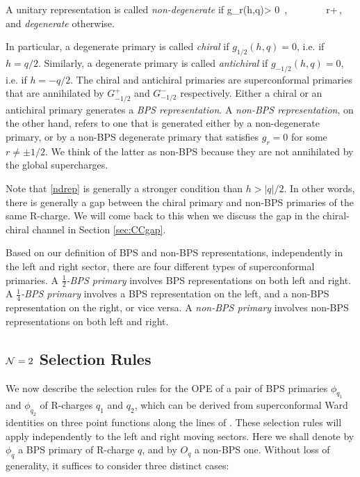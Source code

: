 \documentclass[12pt]{article}
\begin{document}
 
A unitary representation is called  \textit{non-degenerate} if
\ie\label{ndrep}
g_r(h,q)> 0 \,,~~~~~~~\forall\, r\in {}+\,,
\fe
and  \textit{degenerate} otherwise.  

In particular, a degenerate primary is called  \textit{chiral} if $g_{1/2}(h,q)=0$, i.e. if $h=q/2$.  Similarly, a degenerate primary is called  \textit{antichiral}  if $g_{-1/2}(h,q)=0$, i.e. if $h= -q/2$.  The chiral and antichiral primaries are superconformal primaries that are annihilated by $G^+_{-1/2}$ and $G^-_{-1/2}$ respectively.  Either a chiral or an antichiral primary generates a {\it BPS representation}. A {\it non-BPS representation}, on the other hand, refers to one that is generated either by a non-degenerate primary, or by a non-BPS degenerate primary that satisfies $g_{r}=0$ for some $r\neq \pm1/2$.  We think of the latter as non-BPS because they are not annihilated by the global supercharges.

Note that \eqref{ndrep} is generally a stronger condition than $h>|q|/2$.  In other words, there is generally a gap between the chiral primary  and non-BPS primaries of the same R-charge.  We will come back to this when we discuss the gap in the chiral-chiral channel in Section \ref{sec:CCgap}.

Based on our definition of BPS and non-BPS representations, independently in the left and right sector, there are four different types of superconformal primaries.  A \textit{$\frac12$-BPS primary} involves BPS representations on both left and right. A \textit{$\frac14$-BPS primary} involves a BPS  representation on the left, and a  non-BPS representation on the right, or vice versa. A \textit{non-BPS primary} involves non-BPS representations on both left and right.






%


\subsection{${\mathcal N}=2$ Selection Rules}\label{sec:selection}



We now describe the selection rules for the OPE of a pair of BPS primaries $\phi_{q_1}$ and $\phi_{q_2}$ of R-charges $q_1$ and $q_2$, which can be derived from superconformal Ward identities on three point functions along the lines of \cite{Baggio:2012rr,Lin:2015wcg}. These selection rules will apply independently to the left and right moving sectors.
Here we shall denote by $\phi_q$ a BPS primary of R-charge $q$, and by $O_q$ a non-BPS one. Without loss of generality, it suffices to consider three distinct cases:
\end{document}
